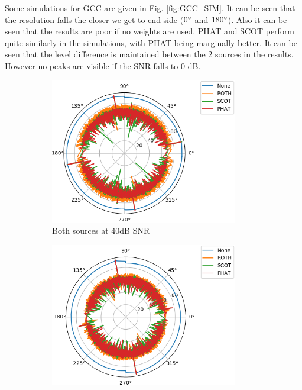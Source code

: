 Some simulations for GCC are given in Fig. \ref{fig:GCC_SIM}. It can be seen that the resolution falls the closer we get to end-side ($0\degree$ and $180\degree$). Also it can be seen that the results are poor if no weights are used. PHAT and SCOT perform quite similarly in the simulations, with PHAT being marginally better. It can be seen that the level difference is maintained between the 2 sources in the results. However no peaks are visible if the SNR falls to 0 dB.

\begin{figure}[H]
    \centering
    \begin{subfigure}[b]{0.48\textwidth}
    \centering
    \includegraphics[width=0.9\textwidth]{Figures/GCC_40.png}
    \caption{Both sources at 40dB SNR}
    \label{fig:d1}
\end{subfigure}
\hfill
\begin{subfigure}[b]{0.48\textwidth}
    \centering
    \includegraphics[width=0.9\textwidth]{Figures/GCC_20_40.png}

\end{subfigure}
\end{figure}
